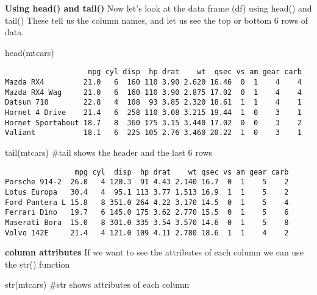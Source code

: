 \documentclass[
  letterpaper,
  DIV=11,
  numbers=noendperiod]{scrartcl}
\newenvironment{Shaded}{\begin{snugshade}}{\end{snugshade}}
\newcommand{\CommentTok}[1]{\textcolor[rgb]{0.37,0.37,0.37}{#1}}
\newcommand{\FunctionTok}[1]{\textcolor[rgb]{0.28,0.35,0.67}{#1}}
\newcommand{\NormalTok}[1]{\textcolor[rgb]{0.00,0.23,0.31}{#1}}
\begin{document}
\textbf{Using head() and tail()} Now let's look at the data frame (df)
using head() and tail() These tell us the column names, and let us see
the top or bottom 6 rows of data.

\begin{Shaded}
\begin{Highlighting}[]
\FunctionTok{head}\NormalTok{(mtcars) }
\end{Highlighting}
\end{Shaded}

\begin{verbatim}
                   mpg cyl disp  hp drat    wt  qsec vs am gear carb
Mazda RX4         21.0   6  160 110 3.90 2.620 16.46  0  1    4    4
Mazda RX4 Wag     21.0   6  160 110 3.90 2.875 17.02  0  1    4    4
Datsun 710        22.8   4  108  93 3.85 2.320 18.61  1  1    4    1
Hornet 4 Drive    21.4   6  258 110 3.08 3.215 19.44  1  0    3    1
Hornet Sportabout 18.7   8  360 175 3.15 3.440 17.02  0  0    3    2
Valiant           18.1   6  225 105 2.76 3.460 20.22  1  0    3    1
\end{verbatim}

\begin{Shaded}
\begin{Highlighting}[]
\FunctionTok{tail}\NormalTok{(mtcars) }\CommentTok{\#tail shows the header and the last 6 rows }
\end{Highlighting}
\end{Shaded}

\begin{verbatim}
                mpg cyl  disp  hp drat    wt qsec vs am gear carb
Porsche 914-2  26.0   4 120.3  91 4.43 2.140 16.7  0  1    5    2
Lotus Europa   30.4   4  95.1 113 3.77 1.513 16.9  1  1    5    2
Ford Pantera L 15.8   8 351.0 264 4.22 3.170 14.5  0  1    5    4
Ferrari Dino   19.7   6 145.0 175 3.62 2.770 15.5  0  1    5    6
Maserati Bora  15.0   8 301.0 335 3.54 3.570 14.6  0  1    5    8
Volvo 142E     21.4   4 121.0 109 4.11 2.780 18.6  1  1    4    2
\end{verbatim}

\textbf{column attributes} If we want to see the attributes of each
column we can use the str() function

\begin{Shaded}
\begin{Highlighting}[]
\FunctionTok{str}\NormalTok{(mtcars) }\CommentTok{\#str shows attributes of each column}
\end{Highlighting}
\end{Shaded}
\end{document}
